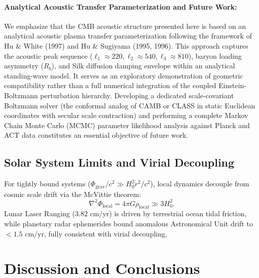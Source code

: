 \documentclass[11pt,a4paper]{article}
\begin{document}
\paragraph{Analytical Acoustic Transfer Parameterization and Future Work:}
We emphasize that the CMB acoustic structure presented here is based on an analytical acoustic plasma transfer parameterization following the framework of Hu \& White (1997) and Hu \& Sugiyama (1995, 1996). This approach captures the acoustic peak sequence ($\ell_1 \approx 220, \ell_2 \approx 540, \ell_3 \approx 810$), baryon loading asymmetry ($R_b$), and Silk diffusion damping envelope within an analytical standing-wave model. It serves as an exploratory demonstration of geometric compatibility rather than a full numerical integration of the coupled Einstein-Boltzmann perturbation hierarchy. Developing a dedicated scale-covariant Boltzmann solver (the conformal analog of CAMB or CLASS in static Euclidean coordinates with secular scale contraction) and performing a complete Markov Chain Monte Carlo (MCMC) parameter likelihood analysis against Planck and ACT data constitutes an essential objective of future work.

\subsection{Solar System Limits and Virial Decoupling}
For tightly bound systems ($\Phi_{\mathrm{grav}}/c^2 \gg H_0^2 r^2/c^2$), local dynamics decouple from cosmic scale drift via the McVittie theorem:
\begin{equation}
    \nabla^2 \Phi_{\mathrm{local}} = 4\pi G \rho_{\mathrm{local}} \gg 3 H_0^2.
\end{equation}
Lunar Laser Ranging ($3.82\text{ cm/yr}$) is driven by terrestrial ocean tidal friction, while planetary radar ephemerides bound anomalous Astronomical Unit drift to $< 1.5\text{ cm/yr}$, fully consistent with virial decoupling.

\section{Discussion and Conclusions}
\label{sec:conclusions}
\end{document}
